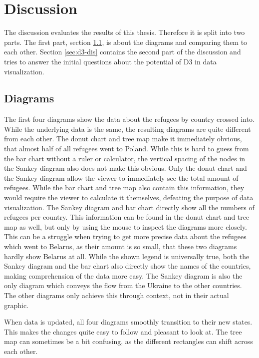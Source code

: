 \chapter{Discussion}\label{sec:discussion}
The discussion evaluates the results of this thesis. Therefore it is split into two parts. The first part, section \ref{sec:diagrams-dis}, is about the diagrams and comparing them to each other. Section \ref{sec:d3-dis} contains the second part of the discussion and tries to answer the initial questions about the potential of D3 in data visualization.

\section{Diagrams}\label{sec:diagrams-dis}
The first four diagrams show the data about the refugees by country crossed into. While the underlying data is the same, the resulting diagrams are quite different from each other.
The donut chart and tree map make it immediately obvious, that almost half of all refugees went to Poland. While this is hard to guess from the bar chart without a ruler or calculator, the vertical spacing of the nodes in the Sankey diagram also does not make this obvious.
Only the donut chart and the Sankey diagram allow the viewer to immediately see the total amount of refugees. While the bar chart and tree map also contain this information, they would require the viewer to calculate it themselves, defeating the purpose of data visualization.
The Sankey diagram and bar chart directly show all the numbers of refugees per country. This information can be found in the donut chart and tree map as well, but only by using the mouse to inspect the diagrams more closely. This can be a struggle when trying to get more precise data about the refugees which went to Belarus, as their amount is so small, that these two diagrams hardly show Belarus at all.
While the shown legend is universally true, both the Sankey diagram and the bar chart also directly show the names of the countries, making comprehension of the data more easy.
The Sankey diagram is also the only diagram which conveys the flow from the Ukraine to the other countries. The other diagrams only achieve this through context, not in their actual graphic.

When data is updated, all four diagrams smoothly transition to their new states. This makes the changes quite easy to follow and pleasant to look at. The tree map can sometimes be a bit confusing, as the different rectangles can shift across each other.

